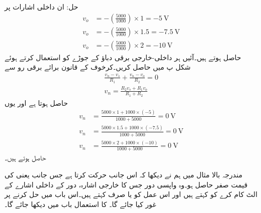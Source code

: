 حل:
ان داخلی اشارات پر
\begin{align*}
v_o&=-\left(\frac{5000}{1000}\right) \times 1=\SI{-5}{\volt}\\
 v_o&=-\left(\frac{5000}{1000}\right) \times 1.5=\SI{-7.5}{\volt}\\
v_o&=-\left(\frac{5000}{1000}\right) \times 2=\SI{-10}{\volt}
\end{align*}
حاصل ہوتے ہیں۔آئیں ہر داخلی-خارجی برقی دباؤ کے جوڑے کو استعمال کرتے ہوئے شکل  پ میں  حاصل کریں۔کرخوف کے قانون برائے برقی رو سے
\begin{align*}
\frac{v_n-v_s}{R_1}+\frac{v_n-v_o}{R_2}=0\\
v_n=\frac{R_2 v_s +R_1 v_o}{R_1+R_2}
\end{align*}
حاصل ہوتا ہے اور یوں
\begin{align*}
v_n&=\frac{5000 \times 1 +1000 \times (-5)}{1000+5000}=\SI{0}{\volt}\\
v_n&=\frac{5000 \times 1.5 +1000 \times (-7.5)}{1000+5000}=\SI{0}{\volt}\\
v_n&=\frac{5000 \times 2 +1000 \times (-10)}{1000+5000}=\SI{0}{\volt}
\end{align*}
حاصل ہوتے ہیں۔

مندرجہ بالا مثال میں ہم نے دیکھا کہ  اس جانب حرکت کرتا ہے جس جانب  یعنی  کی قیمت صفر حاصل ہو۔وہ واپسی دور جس کا خارجی اشارہ، دور کے داخلی اشارے کے الٹ کام کرے کو  کہتے ہیں اور اس عمل کو  یا صرف  کہتے ہیں۔اس باب میں  حل کرنے پر غور کیا جائے گا۔ کا استعمال باب  میں دیکھا جائے گا۔  
 
